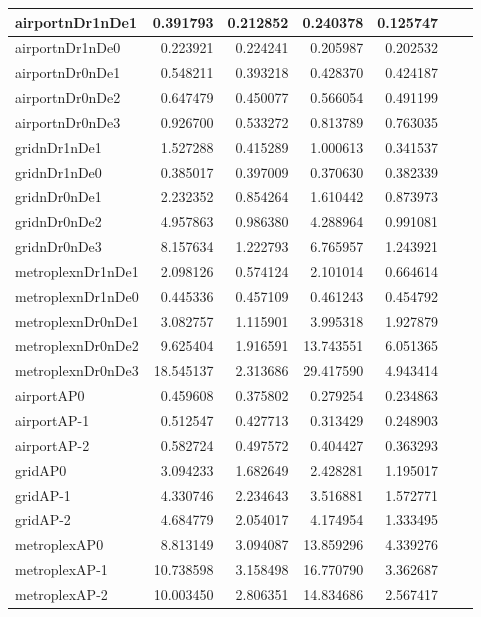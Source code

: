 \begin{longtable}{|l|r|r|r|r|r|r|}
\endlastfoot
airportnDr1nDe1 & 0.391793 & 0.212852 & 0.240378 & 0.125747 \\ \hline
airportnDr1nDe0 & 0.223921 & 0.224241 & 0.205987 & 0.202532 \\ \hline
airportnDr0nDe1 & 0.548211 & 0.393218 & 0.428370 & 0.424187 \\ \hline
airportnDr0nDe2 & 0.647479 & 0.450077 & 0.566054 & 0.491199 \\ \hline
airportnDr0nDe3 & 0.926700 & 0.533272 & 0.813789 & 0.763035 \\ \hline
gridnDr1nDe1 & 1.527288 & 0.415289 & 1.000613 & 0.341537 \\ \hline
gridnDr1nDe0 & 0.385017 & 0.397009 & 0.370630 & 0.382339 \\ \hline
gridnDr0nDe1 & 2.232352 & 0.854264 & 1.610442 & 0.873973 \\ \hline
gridnDr0nDe2 & 4.957863 & 0.986380 & 4.288964 & 0.991081 \\ \hline
gridnDr0nDe3 & 8.157634 & 1.222793 & 6.765957 & 1.243921 \\ \hline
metroplexnDr1nDe1 & 2.098126 & 0.574124 & 2.101014 & 0.664614 \\ \hline
metroplexnDr1nDe0 & 0.445336 & 0.457109 & 0.461243 & 0.454792 \\ \hline
metroplexnDr0nDe1 & 3.082757 & 1.115901 & 3.995318 & 1.927879 \\ \hline
metroplexnDr0nDe2 & 9.625404 & 1.916591 & 13.743551 & 6.051365 \\ \hline
metroplexnDr0nDe3 & 18.545137 & 2.313686 & 29.417590 & 4.943414 \\ \hline
airportAP0 & 0.459608 & 0.375802 & 0.279254 & 0.234863 \\ \hline
airportAP-1 & 0.512547 & 0.427713 & 0.313429 & 0.248903 \\ \hline
airportAP-2 & 0.582724 & 0.497572 & 0.404427 & 0.363293 \\ \hline
gridAP0 & 3.094233 & 1.682649 & 2.428281 & 1.195017 \\ \hline
gridAP-1 & 4.330746 & 2.234643 & 3.516881 & 1.572771 \\ \hline
gridAP-2 & 4.684779 & 2.054017 & 4.174954 & 1.333495 \\ \hline
metroplexAP0 & 8.813149 & 3.094087 & 13.859296 & 4.339276 \\ \hline
metroplexAP-1 & 10.738598 & 3.158498 & 16.770790 & 3.362687 \\ \hline
metroplexAP-2 & 10.003450 & 2.806351 & 14.834686 & 2.567417 \\ \hline

\end{longtable}
